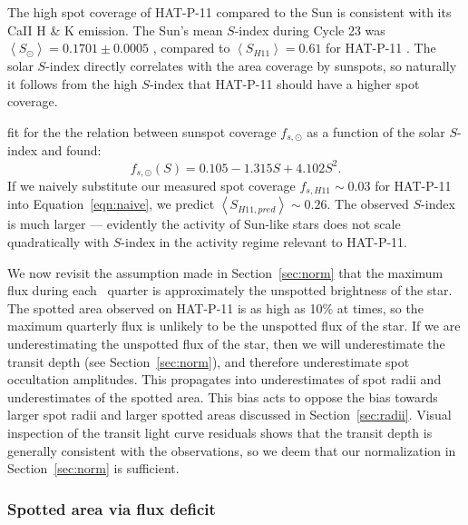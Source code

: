 The high spot coverage of HAT-P-11 compared to the Sun is consistent with its CaII H \& K emission. The Sun's mean $S$-index during Cycle 23 was $\left<S_\odot\right> = 0.1701 \pm 0.0005$ \citep{Egeland2017}, compared to $\left<S_{H11}\right> = 0.61$ for HAT-P-11 \citep{bakos2010}. The solar $S$-index directly correlates with the area coverage by sunspots, so naturally it follows from the high $S$-index that HAT-P-11 should have a higher spot coverage. 

\citet{Shapiro2014} fit for the the relation between sunspot coverage $f_{s,\odot}$ as a function of the solar $S$-index and found:
\begin{equation}
f_{s,\odot}(S) = 0.105 - 1.315 S + 4.102 S^2. \label{eqn:naive}
\end{equation}
If we naively substitute our measured spot coverage $f_{s,H11} \sim 0.03$ for HAT-P-11 into Equation~\ref{eqn:naive}, we predict $\left<S_{H11, pred}\right> \sim 0.26$. The observed $S$-index is much larger --- evidently the activity of Sun-like stars does not scale quadratically with $S$-index in the activity regime relevant to HAT-P-11.

We now revisit the assumption made in Section~\ref{sec:norm} that the maximum flux during each \kepler\ quarter is approximately the unspotted brightness of the star. The spotted area observed on HAT-P-11 is as high as 10\% at times, so the maximum quarterly flux is unlikely to be the unspotted flux of the star. If we are underestimating the unspotted flux of the star, then we will underestimate the transit depth (see Section~\ref{sec:norm}), and therefore underestimate spot occultation amplitudes. This propagates into underestimates of spot radii and underestimates of the spotted area. This bias acts to oppose the bias towards larger spot radii and larger spotted areas discussed in Section~\ref{sec:radii}. Visual inspection of the transit light curve residuals shows that the transit depth is generally consistent with the observations, so we deem that our normalization in Section~\ref{sec:norm} is sufficient.

\subsubsection{Spotted area via flux deficit}

